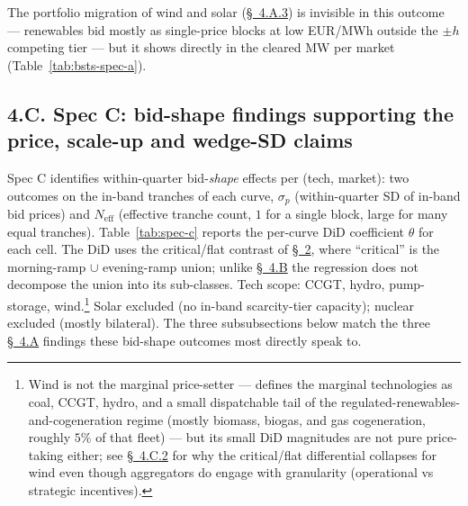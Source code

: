 \documentclass[11pt]{article}
\begin{document}
The portfolio migration of wind and solar (\hyperref[sec:4-renewable]{\S~4.A.3}) is invisible in this outcome --- renewables bid mostly as single-price blocks at low EUR/MWh outside the $\pm h$ competing tier --- but it shows directly in the cleared MW per market (Table~\ref{tab:bsts-spec-a}).

\vspace{10pt}

\subsection*{4.C. Spec C: bid-shape findings supporting the price, scale-up and wedge-SD claims}
\label{sec:4-specC}
Spec C identifies within-quarter bid-\emph{shape} effects per (tech, market): two outcomes on the in-band tranches of each curve, $\sigma_p$ (within-quarter SD of in-band bid prices) and $N_{\text{eff}}$ (effective tranche count, $1$ for a single block, large for many equal tranches). Table~\ref{tab:spec-c} reports the per-curve DiD coefficient $\theta$ for each cell. The DiD uses the critical/flat contrast of \hyperref[sec:partition]{\S~2}, where ``critical'' is the morning-ramp $\cup$ evening-ramp union; unlike \hyperref[sec:4-specB]{\S~4.B} the regression does not decompose the union into its sub-classes. Tech scope: CCGT, hydro, pump-storage, wind.\footnote{Wind is not the marginal price-setter --- \citet{cnmc_supervision_2025} defines the marginal technologies as coal, CCGT, hydro, and a small dispatchable tail of the regulated-renewables-and-cogeneration regime (mostly biomass, biogas, and gas cogeneration, roughly $5\%$ of that fleet) --- but its small DiD magnitudes are not pure price-taking either; see \hyperref[sec:4-c-id15-ida]{\S~4.C.2} for why the critical/flat differential collapses for wind even though aggregators do engage with granularity (operational vs strategic incentives).} Solar excluded (no in-band scarcity-tier capacity); nuclear excluded (mostly bilateral). The three subsubsections below match the three \hyperref[sec:4-specA]{\S~4.A} findings these bid-shape outcomes most directly speak to.
\end{document}
